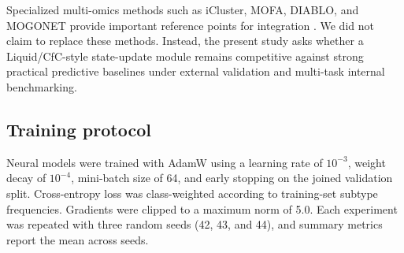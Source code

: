\begin{table}[ht]
\centering
\caption{Baseline families used to avoid a single-model single-score evaluation.}
\label{tab:baseline_families}
\end{table}

Specialized multi-omics methods such as iCluster, MOFA, DIABLO, and MOGONET provide important reference points for integration \cite{shen_icluster_2009,argelaguet_mofa_2018,singh_diablo_2019,wang_mogonet_2021}. We did not claim to replace these methods. Instead, the present study asks whether a Liquid/CfC-style state-update module remains competitive against strong practical predictive baselines under external validation and multi-task internal benchmarking.

\subsection{Training protocol}

Neural models were trained with AdamW using a learning rate of \(10^{-3}\), weight decay of \(10^{-4}\), mini-batch size of 64, and early stopping on the joined validation split. Cross-entropy loss was class-weighted according to training-set subtype frequencies. Gradients were clipped to a maximum norm of 5.0. Each experiment was repeated with three random seeds (42, 43, and 44), and summary metrics report the mean across seeds.

